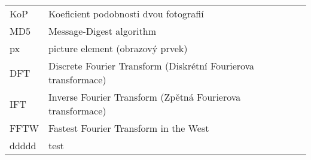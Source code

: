 
\seznamzkr

\begin{tabular}{ll}
  KoP	& Koeficient podobnosti dvou fotografií								\\
  MD5	& Message-Digest algorithm											\\
  px	& picture element (obrazový prvek)									\\
  DFT	& Discrete Fourier Transform (Diskrétní Fourierova transformace)	\\
  IFT	& Inverse Fourier Transform (Zpětná Fourierova transformace)	\\
  FFTW	& Fastest Fourier Transform in the West \\
  ddddd	& test
\end{tabular}

